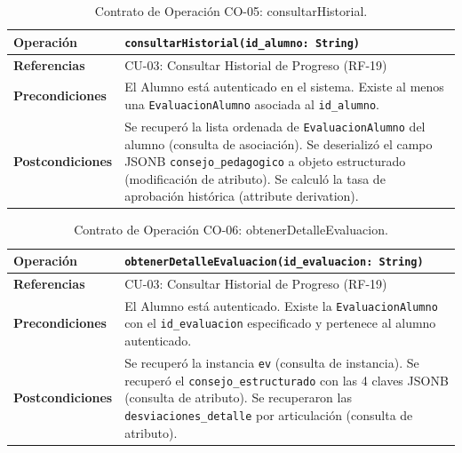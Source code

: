 \documentclass[12pt,letterpaper]{article}
\begin{document}
\begin{table}[H]
\centering
\small
\begin{tabularx}{\textwidth}{|l|X|}
\hline
\textbf{Operación} & \texttt{consultarHistorial(id\_alumno: String)} \\
\hline
\textbf{Referencias} & CU-03: Consultar Historial de Progreso (RF-19) \\
\hline
\textbf{Precondiciones} & El Alumno está autenticado en el sistema. \newline
Existe al menos una \texttt{EvaluacionAlumno} asociada al \texttt{id\_alumno}. \\
\hline
\textbf{Postcondiciones} & Se recuperó la lista ordenada de \texttt{EvaluacionAlumno} del alumno (consulta de asociación). \newline
Se deserializó el campo JSONB \texttt{consejo\_pedagogico} a objeto estructurado (modificación de atributo). \newline
Se calculó la tasa de aprobación histórica (attribute derivation). \\
\hline
\end{tabularx}
\caption{Contrato de Operación CO-05: consultarHistorial.}
\label{tab:co-05}
\end{table}

\begin{table}[H]
\centering
\small
\begin{tabularx}{\textwidth}{|l|X|}
\hline
\textbf{Operación} & \texttt{obtenerDetalleEvaluacion(id\_evaluacion: String)} \\
\hline
\textbf{Referencias} & CU-03: Consultar Historial de Progreso (RF-19) \\
\hline
\textbf{Precondiciones} & El Alumno está autenticado. \newline
Existe la \texttt{EvaluacionAlumno} con el \texttt{id\_evaluacion} especificado y pertenece al alumno autenticado. \\
\hline
\textbf{Postcondiciones} & Se recuperó la instancia \texttt{ev} (consulta de instancia). \newline
Se recuperó el \texttt{consejo\_estructurado} con las 4 claves JSONB (consulta de atributo). \newline
Se recuperaron las \texttt{desviaciones\_detalle} por articulación (consulta de atributo). \\
\hline
\end{tabularx}
\caption{Contrato de Operación CO-06: obtenerDetalleEvaluacion.}
\label{tab:co-06}
\end{table}
\end{document}

